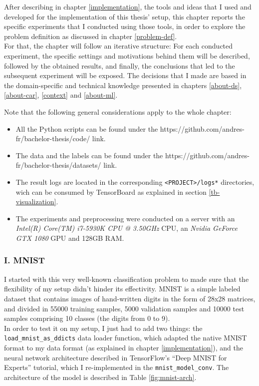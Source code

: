 After describing in chapter \ref{implementation}, the tools and ideas that I used and developed for the implementation of this thesis' setup, this chapter reports the specific experiments that I conducted using those tools, in order to explore the problem definition as discussed in chapter \ref{problem-def}.\\

For that, the chapter will follow an iterative structure: For each conducted experiment, the specific settings and motivations behind them will be described, followed by the obtained results, and finally, the conclusions that led to the subsequent experiment will be exposed. The decisions that I made are based in the domain-specific and technical knowledge presented in chapters \ref{about-ds},\ref{about-car}, \ref{context} and \ref{about-ml}.

Note that the following general considerations apply to the whole chapter:
\begin{itemize}
\item All the Python scripts can be found under the https://github.com/andres-fr/bachelor-thesis/code/ link.
\item The data and the labels can be found under the https://github.com/andres-fr/bachelor-thesis/datasets/ link.
\item The result logs are located in the corresponding \texttt{<PROJECT>/logs*} directories, wich can be consumed by TensorBoard as explained in section \ref{tb-visualization}.
\item The experiments and preprocessing were conducted on a server with an {\it Intel(R) Core(TM) i7-5930K CPU @ 3.50GHz} CPU, an {\it Nvidia GeForce GTX 1080} GPU and 128GB RAM.
\end{itemize}


\subsubsection{I. MNIST}

I started with this very well-known classification problem to made sure that the flexibility of my setup didn't hinder its effectivity. MNIST is a simple labeled dataset that contains images of hand-written digits in the form of 28x28 matrices, and divided in 55000 training samples, 5000 validation samples and 10000 test samples comprising 10 classes (the digits from 0 to 9).\\

In order to test it on my setup, I just had to add two things: the \texttt{load\_mnist\_as\_ddicts} data loader function, which adapted the native MNIST format to my data format (as explained in chapter \ref{implementation}), and the neural network architecture described in TensorFlow's ``Deep MNIST for Experts'' tutorial\cite{tf-cnn}, which I re-implemented in the \texttt{mnist\_model\_conv}. The architecture of the model is described in Table \ref{fig:mnist-arch}.\\

